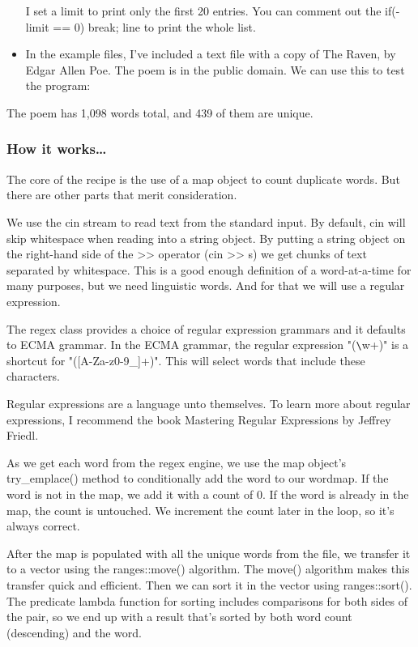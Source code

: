 \begin{itemize}
I set a limit to print only the first 20 entries. You can comment out the if(-limit == 0) break; line to print the whole list.

\item 
In the example files, I've included a text file with a copy of The Raven, by Edgar Allen Poe. The poem is in the public domain. We can use this to test the program:


\end{itemize}

The poem has 1,098 words total, and 439 of them are unique.

\subsubsection{How it works…}

The core of the recipe is the use of a map object to count duplicate words. But there are other parts that merit consideration.

We use the cin stream to read text from the standard input. By default, cin will skip whitespace when reading into a string object. By putting a string object on the right-hand side of the >{}> operator (cin >{}> s) we get chunks of text separated by whitespace. This is a good enough definition of a word-at-a-time for many purposes, but we need linguistic words. And for that we will use a regular expression.

The regex class provides a choice of regular expression grammars and it defaults to ECMA grammar. In the ECMA grammar, the regular expression "(\verb|\|w+)" is a shortcut for "([A-Za-z0-9\_]+)". This will select words that include these characters.

Regular expressions are a language unto themselves. To learn more about regular expressions, I recommend the book Mastering Regular Expressions by Jeffrey Friedl.

As we get each word from the regex engine, we use the map object's try\_emplace() method to conditionally add the word to our wordmap. If the word is not in the map, we add it with a count of 0. If the word is already in the map, the count is untouched. We increment the count later in the loop, so it's always correct.

After the map is populated with all the unique words from the file, we transfer it to a vector using the ranges::move() algorithm. The move() algorithm makes this transfer quick and efficient. Then we can sort it in the vector using ranges::sort(). The predicate lambda function for sorting includes comparisons for both sides of the pair, so we end up with a result that's sorted by both word count (descending) and the word.


